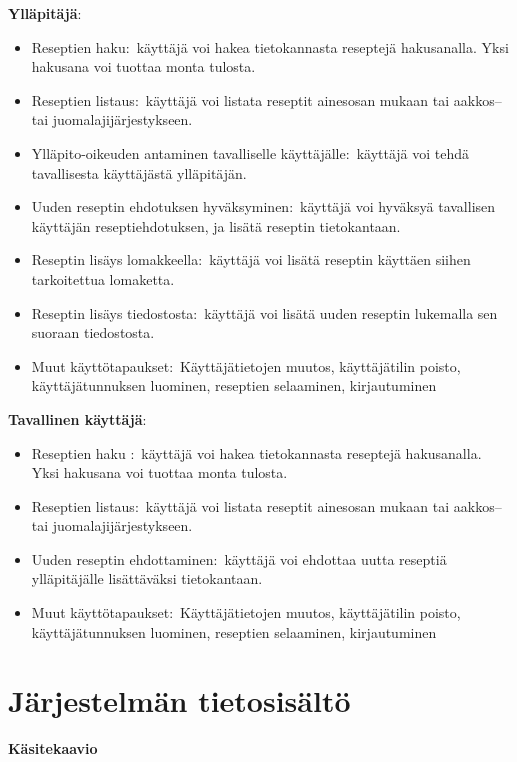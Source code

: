 \documentclass[a4paper]{article}
\begin{document}
\begin{flushleft}\textbf{Ylläpitäjä\(\colon\)} \end{flushleft}
\begin{itemize}
	\item Reseptien haku\(\colon\) käyttäjä voi hakea tietokannasta reseptejä hakusanalla. Yksi hakusana voi tuottaa monta tulosta.
	\item Reseptien listaus\(\colon\) käyttäjä voi listata reseptit ainesosan mukaan tai aakkos-- tai juomalajijärjestykseen.
	\item Ylläpito-oikeuden antaminen tavalliselle käyttäjälle\(\colon\) käyttäjä voi tehdä tavallisesta käyttäjästä ylläpitäjän. 
	\item Uuden reseptin ehdotuksen hyväksyminen\(\colon\) käyttäjä voi hyväksyä tavallisen käyttäjän reseptiehdotuksen, ja lisätä reseptin tietokantaan.
	\item Reseptin lisäys lomakkeella\(\colon\) käyttäjä voi lisätä reseptin käyttäen siihen tarkoitettua lomaketta.
	\item Reseptin lisäys tiedostosta\(\colon\) käyttäjä voi lisätä uuden reseptin lukemalla sen suoraan tiedostosta. 
	\item Muut käyttötapaukset\(\colon\) Käyttäjätietojen muutos, käyttäjätilin poisto, käyttäjätunnuksen luominen, reseptien selaaminen, kirjautuminen
\end{itemize}

\begin{flushleft}\textbf{Tavallinen käyttäjä\(\colon\)} \end{flushleft}

\begin{itemize}
	\item Reseptien haku \(\colon\) käyttäjä voi hakea tietokannasta reseptejä hakusanalla. Yksi hakusana voi tuottaa monta tulosta.
	\item Reseptien listaus\(\colon\) käyttäjä voi listata reseptit ainesosan mukaan tai aakkos-- tai juomalajijärjestykseen.
	\item Uuden reseptin ehdottaminen\(\colon\) käyttäjä voi ehdottaa uutta reseptiä ylläpitäjälle lisättäväksi tietokantaan.
	\item Muut käyttötapaukset\(\colon\) Käyttäjätietojen muutos, käyttäjätilin poisto, käyttäjätunnuksen luominen, reseptien selaaminen, kirjautuminen
\end{itemize}

\newpage
\section{Järjestelmän tietosisältö}
\begin{flushleft}\textbf{Käsitekaavio} \end{flushleft}
\end{document}
